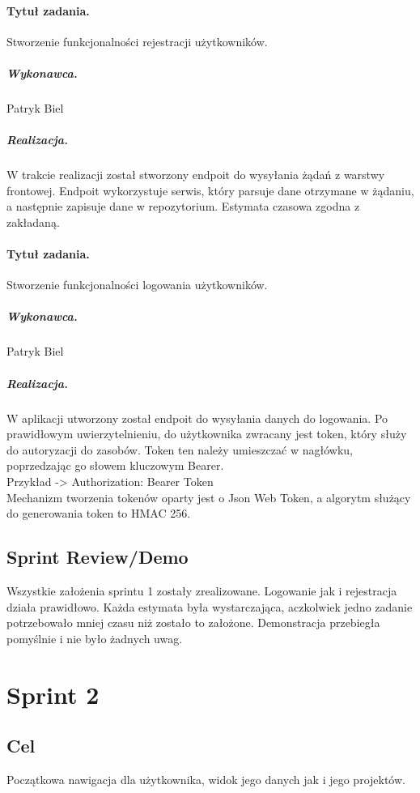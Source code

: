 \documentclass[a4paper]{article}
\begin{document}
\paragraph{Tytuł zadania.} Stworzenie funkcjonalności rejestracji użytkowników.
\subparagraph{Wykonawca.} Patryk Biel
\subparagraph{Realizacja.} W trakcie realizacji został stworzony endpoit do wysyłania żądań z warstwy frontowej. 
Endpoit wykorzystuje serwis, który parsuje dane otrzymane w żądaniu, a następnie zapisuje dane w repozytorium. Estymata czasowa zgodna z zakładaną.


\paragraph{Tytuł zadania.} Stworzenie funkcjonalności logowania użytkowników.
\subparagraph{Wykonawca.} Patryk Biel
\subparagraph{Realizacja.} W aplikacji utworzony został endpoit do wysyłania danych do logowania. Po prawidłowym uwierzytelnieniu, do użytkownika zwracany jest token, który służy do autoryzacji do zasobów. Token ten należy umieszczać w nagłówku, poprzedzając go słowem kluczowym Bearer. \\
Przykład -> Authorization: Bearer Token\\
Mechanizm tworzenia tokenów oparty jest o Json Web Token, a algorytm służący do generowania token to HMAC 256.



\subsection{Sprint Review/Demo}

Wszystkie założenia sprintu 1 zostały zrealizowane. Logowanie jak i rejestracja działa prawidłowo. Każda estymata była wystarczająca, aczkolwiek jedno zadanie potrzebowało mniej czasu niż zostało to założone. Demonstracja przebiegła pomyślnie i nie było żadnych uwag. 









\section{Sprint 2}

\subsection{Cel} Początkowa nawigacja dla użytkownika, widok jego danych jak i jego projektów.
\end{document}

